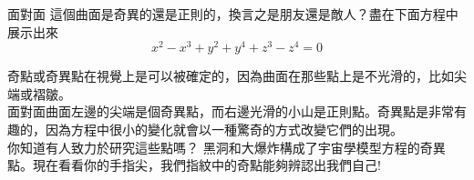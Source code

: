 \begin{surferPage}{面對面}
這個曲面是奇異的還是正則的，換言之是朋友還是敵人？盡在下面方程中展示出來\\
\smallskip
\[x^2	- x^3+ y^2+ y^4+ z^3- z^4	=  0\]

\vspace{0.3cm}

奇點或奇異點在視覺上是可以被確定的，因為曲面在那些點上是不光滑的，比如尖端或褶皺。\\

\vspace{0.3cm}
面對面曲面左邊的尖端是個奇異點，而右邊光滑的小山是正則點。奇異點是非常有趣的，因為方程中很小的變化就會以一種驚奇的方式改變它們的出現。 \\

\vspace{0.3cm}
你知道有人致力於研究這些點嗎？ 黑洞和大爆炸構成了宇宙學模型方程的奇異點。現在看看你的手指尖，我們指紋中的奇點能夠辨認出我們自己!
\end{surferPage}
